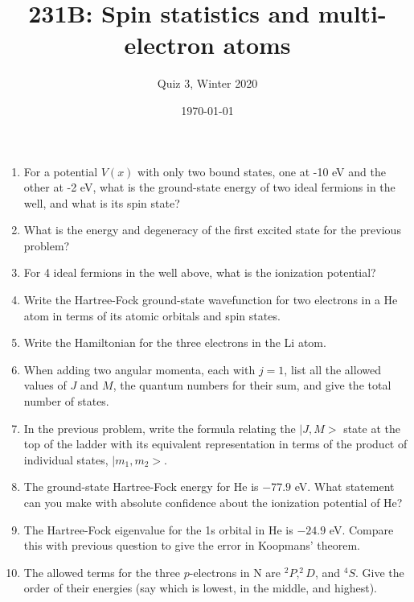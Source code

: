 




\title{231B: Spin statistics and multi-electron atoms}
\author{Quiz 3, Winter 2020}
\date{\today}
\maketitle

\begin{enumerate}

\item For a potential $V(x)$ with only two bound states, one at -10 eV
and the other at -2 eV, what is the ground-state energy of two ideal
fermions in the well, and what is its spin state?

\item What is the energy and degeneracy of the first excited state for the previous
problem?

\item For 4 ideal fermions in the well above, what is the ionization potential?

\item Write the Hartree-Fock ground-state wavefunction for two electrons in a He atom in terms
of its atomic orbitals and spin states.

\item Write the Hamiltonian for the three electrons in the Li atom.

\item When adding two angular momenta, each with $j=1$, list all the allowed
values of $J$ and $M$, the quantum numbers for their sum, and give the total number of states.

\item In the previous problem, write the formula relating the $|J,M>$
state at the top
of the ladder with its equivalent representation in terms of the
product of individual states, $|m_1,m_2>$.

\item The ground-state Hartree-Fock energy for He is $-77.9$ eV.  What statement can
you make with absolute confidence about the ionization potential of He?

\item The Hartree-Fock eigenvalue for the 1s orbital in He is $-24.9$ eV.  Compare
this with previous question to give the error in Koopmans' theorem.

\item The allowed terms for the three $p$-electrons in N are $^2P, ^2D$, and $^4S$.
Give the order of their energies (say which is lowest, in the middle, and highest).


\end{enumerate}

